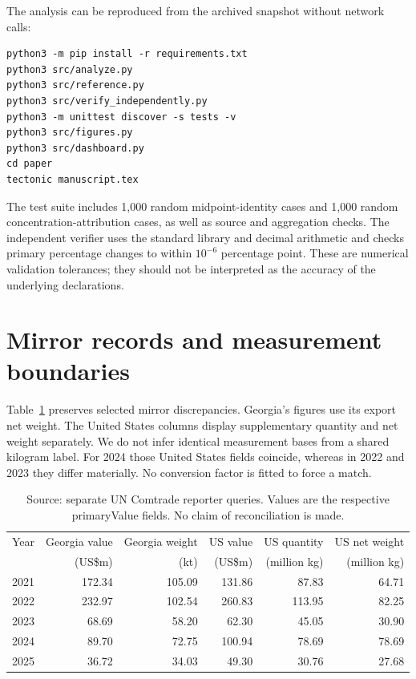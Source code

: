 \documentclass[11pt,a4paper]{article}
\begin{document}
The analysis can be reproduced from the archived snapshot without network calls:
\begin{verbatim}
python3 -m pip install -r requirements.txt
python3 src/analyze.py
python3 src/reference.py
python3 src/verify_independently.py
python3 -m unittest discover -s tests -v
python3 src/figures.py
python3 src/dashboard.py
cd paper
tectonic manuscript.tex
\end{verbatim}
The test suite includes 1,000 random midpoint-identity cases and 1,000 random concentration-attribution cases, as well as source and aggregation checks. The independent verifier uses the standard library and decimal arithmetic and checks primary percentage changes to within $10^{-6}$ percentage point. These are numerical validation tolerances; they should not be interpreted as the accuracy of the underlying declarations.

\section{Mirror records and measurement boundaries}\label{app:mirror}
Table~\ref{tab:mirror} preserves selected mirror discrepancies. Georgia's figures use its export net weight. The United States columns display supplementary quantity and net weight separately. We do not infer identical measurement bases from a shared kilogram label. For 2024 those United States fields coincide, whereas in 2022 and 2023 they differ materially. No conversion factor is fitted to force a match.

\begin{table}[htbp]\centering\small
\caption{The Georgia--United States route in the two reporting systems.}\label{tab:mirror}
\begin{tabular}{rrrrrr}\toprule
Year & Georgia value & Georgia weight & US value & US quantity & US net weight\\
 & (US\$m) & (kt) & (US\$m) & (million kg) & (million kg)\\\midrule
2021 &172.34&105.09&131.86&87.83&64.71\\
2022 &232.97&102.54&260.83&113.95&82.25\\
2023 &68.69&58.20&62.30&45.05&30.90\\
2024 &89.70&72.75&100.94&78.69&78.69\\
2025 &36.72&34.03&49.30&30.76&27.68\\\bottomrule
\end{tabular}
\caption*{Source: separate UN Comtrade reporter queries. Values are the respective primaryValue fields. No claim of reconciliation is made.}
\end{table}
\end{document}

